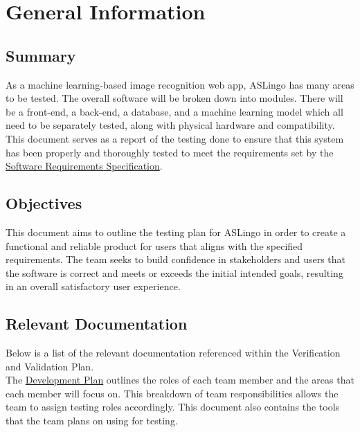 \documentclass[12pt, titlepage]{article}
\begin{document}
\listoftables %


\newpage


\section{General Information}

\subsection{Summary}

As a machine learning-based image recognition web app, ASLingo has many areas to be tested. The overall software will be broken down into modules. There will be a front-end, a back-end, a database, and a machine learning model which all need to be separately tested, along with physical hardware and compatibility. This document serves as a report of the testing done to ensure that this system has been properly and thoroughly tested to meet the requirements set by the \href{https://github.com/stanreee/sign-language-learning/blob/main/docs/SRS/SRS.pdf}{Software Requirements Specification}.  

\subsection{Objectives}

This document aims to outline the testing plan for ASLingo in order to create a functional and reliable product for users that aligns with the specified requirements. The team seeks to build confidence in stakeholders and users that the software is correct and meets or exceeds the initial intended goals, resulting in an overall satisfactory user experience.

\subsection{Relevant Documentation} 

Below is a list of the relevant documentation referenced within the Verification and Validation Plan.\\

\noindent The \href{https://github.com/stanreee/sign-language-learning/blob/main/docs/DevelopmentPlan/DevelopmentPlan.pdf}{Development Plan} outlines the roles of each team member and the areas that each member will focus on. This breakdown of team responsibilities allows the team to assign testing roles accordingly. This document also contains the tools that the team plans on using for testing.\\
\end{document}
